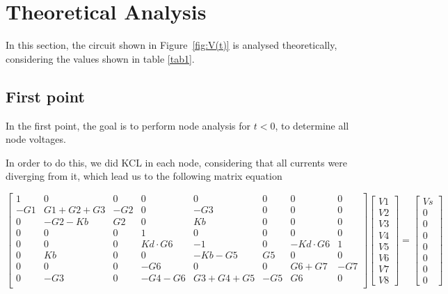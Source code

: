 \section{Theoretical Analysis}
\label{sec:theoretical}

\noindent \par In this section, the circuit shown in Figure~\ref{fig:V(t)} is analysed theoretically, considering the values shown in table \ref{tab1}.

\subsection{First point}
\label{ssec:1T}
\noindent \par In the first point, the goal is to perform node analysis for $t<0$, to determine all node voltages.
\par In order to do this, we did KCL in each node, considering that all currents were diverging from it, which lead us to the following matrix equation

\begin{equation}
\label{eq:teo1}
	\begin{bmatrix}
	1 & 0 & 0 & 0 & 0 & 0 & 0 & 0 \\ -G1 & G1+G2+G3 & -G2 & 0 & -G3 & 0 & 0 & 0 \\ 0 & -G2-Kb & G2 & 0 & Kb & 0 & 0 & 0 \\ 0 & 0 & 0 & 1 & 0 & 0 & 0 & 0 \\ 0 & 0 & 0 & Kd \cdot G6 & -1 & 0 & -Kd 		\cdot G6 & 1 \\ 0 & Kb & 0 & 0 & -Kb-G5 & G5 & 0 & 0 \\ 0 & 0 & 0 & -G6 & 0 & 0 & G6+G7 & -G7 \\ 0 & -G3 & 0 & -G4-G6 & G3+G4+G5 & -G5 & G6 & 0 \\
	\end{bmatrix}
	\begin{bmatrix}
	V1 \\ V2 \\ V3 \\ V4 \\ V5 \\ V6 \\ V7 \\ V8
	\end{bmatrix}
	=
	\begin{bmatrix}
	Vs \\ 0 \\ 0 \\ 0 \\ 0 \\ 0 \\ 0 \\ 0
	\end{bmatrix}
\end{equation}

